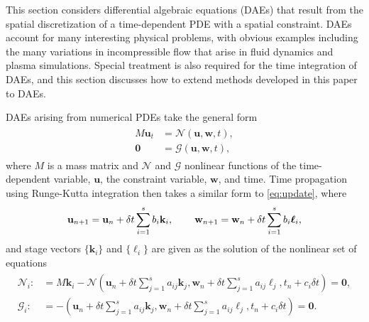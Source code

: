 \documentclass[review]{siamart}
\begin{document}
This section considers differential algebraic equations (DAEs) that result from
the spatial discretization of a time-dependent PDE with a spatial constraint.
DAEs account for many interesting physical problems, with obvious examples
including the many variations in incompressible flow that arise in fluid
dynamics and plasma simulations. Special treatment is also required for
the time integration of DAEs, and this section discusses how to extend
methods developed in this paper to DAEs.

DAEs arising from numerical PDEs take the general form
%
\begin{align}\label{eq:dae}
\begin{split}
M\mathbf{u}_t & = \mathcal{N}(\mathbf{u},\mathbf{w},t), \\
\mathbf{0} & = \mathcal{G}(\mathbf{u},\mathbf{w},t),
\end{split}
\end{align}
%
where $M$ is a mass matrix and $\mathcal{N}$ and $\mathcal{G}$ nonlinear
functions of the time-dependent variable, $\mathbf{u}$, the constraint
variable, $\mathbf{w}$, and time. 
Time propagation using Runge-Kutta integration then takes a similar form to
\eqref{eq:update}, where
%
\begin{align*}
\mathbf{u}_{n+1} = \mathbf{u}_n + \delta t\sum_{i=1}^s b_i\mathbf{k}_i, \hspace{5ex}
\mathbf{w}_{n+1} = \mathbf{w}_n + \delta t\sum_{i=1}^s b_i\boldsymbol{\ell}_i,
\end{align*}
%
and stage vectors $\{\mathbf{k}_i\}$ and $\{\boldsymbol{\ell}_i\}$ are
given as the solution of the nonlinear set of equations
%
\begin{align}\label{eq:dae_stage}
\begin{split}
\mathcal{N}_i :&= M\mathbf{k}_i -
	\mathcal{N} \left (\mathbf{u}_{n} + \delta t\sum_{j=1}^s a_{ij}\mathbf{k}_j,
	\mathbf{w}_{n} + \delta t\sum_{j=1}^s a_{ij}\boldsymbol{\ell}_j, t_{n} + c_i\delta t\right)
	= \mathbf{0}, \\
\mathcal{G}_i :&= - \left (\mathbf{u}_{n} + \delta t\sum_{j=1}^s a_{ij}\mathbf{k}_j,
	\mathbf{w}_{n} + \delta t\sum_{j=1}^s a_{ij}\boldsymbol{\ell}_j, t_{n} + c_i\delta t\right)
	= \mathbf{0}.
\end{split}
\end{align}
%
\end{document}
